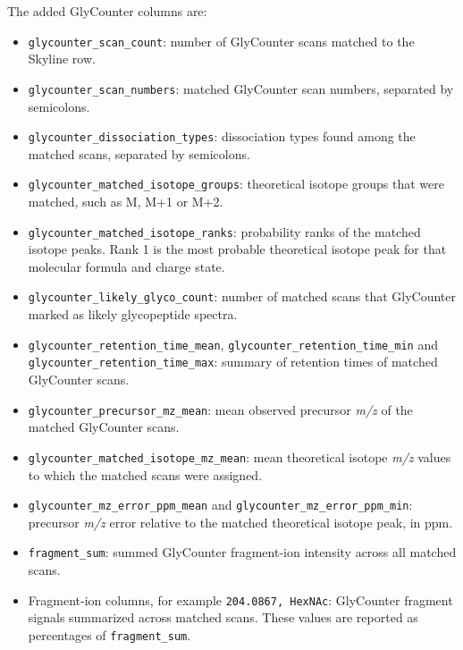 \begin{optionalbox}
	\vspace{.5em}
	The added GlyCounter columns are:
	\begin{itemize}[topsep=0pt, itemsep=0pt]
		\item \texttt{glycounter\_scan\_count}: number of GlyCounter scans matched to the Skyline row.
		\item \texttt{glycounter\_scan\_numbers}: matched GlyCounter scan numbers, separated by semicolons.
		\item \texttt{glycounter\_dissociation\_types}: dissociation types found among the matched scans, separated by semicolons.
		\item \texttt{glycounter\_matched\_isotope\_groups}: theoretical isotope groups that were matched, such as \textsf{M}, \textsf{M+1} or \textsf{M+2}.
		\item \texttt{glycounter\_matched\_isotope\_ranks}: probability ranks of the matched isotope peaks. Rank 1 is the most probable theoretical isotope peak for that molecular formula and charge state.
		\item \texttt{glycounter\_likely\_glyco\_count}: number of matched scans that GlyCounter marked as likely glycopeptide spectra.
		\item \texttt{glycounter\_retention\_time\_mean}, \texttt{glycounter\_retention\_time\_min} and \texttt{glycounter\_retention\_time\_max}: summary of retention times of matched GlyCounter scans.
		\item \texttt{glycounter\_precursor\_mz\_mean}: mean observed precursor \textit{m/z} of the matched GlyCounter scans.
		\item \texttt{glycounter\_matched\_isotope\_mz\_mean}: mean theoretical isotope \textit{m/z} values to which the matched scans were assigned.
		\item \texttt{glycounter\_mz\_error\_ppm\_mean} and \texttt{glycounter\_mz\_error\_ppm\_min}: precursor \textit{m/z} error relative to the matched theoretical isotope peak, in ppm.
		\item \texttt{fragment\_sum}: summed GlyCounter fragment-ion intensity across all matched scans.
		\item Fragment-ion columns, for example \texttt{204.0867, HexNAc}: GlyCounter fragment signals summarized across matched scans. These values are reported as percentages of \texttt{fragment\_sum}.
	\end{itemize}
\end{optionalbox}



